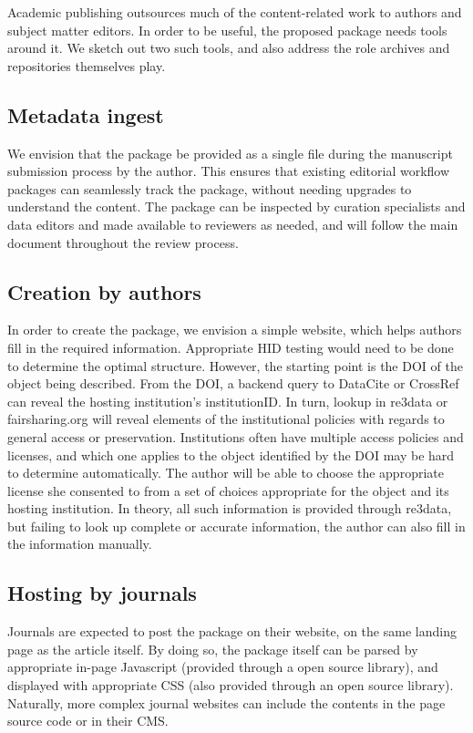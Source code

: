 Academic publishing outsources much of the content-related work to authors and subject matter editors. In order to be useful, the proposed package needs tools around it. We sketch out two such tools, and also address the role archives and repositories themselves play. 
\subsection{Metadata ingest}

We envision that the package be provided as a single file during the manuscript submission process by the author. This ensures that existing editorial workflow packages can seamlessly track the package, without needing upgrades to understand the content. The package can be inspected by curation specialists and data editors and made available to reviewers as needed, and will follow the main document throughout the review process. 
           
\subsection{Creation by authors}
In order to create the package, we envision a simple website, which helps authors fill in the required information. Appropriate HID testing would need to be done to determine the optimal structure. However, the starting point is the DOI of the object being described. From the DOI, a backend query to DataCite or CrossRef can reveal the hosting institution's institutionID. In turn, lookup in re3data or fairsharing.org will reveal elements of the institutional policies with regards to general access or preservation. Institutions often have multiple access policies and licenses, and which one applies to the object identified by the DOI may be hard to determine automatically. The author will be able to choose the appropriate license she consented to from a set of choices appropriate for the object and its hosting institution. In theory, all such information is provided through re3data, but failing to look up complete or accurate information, the author can also fill in the information manually. 
           
\subsection{Hosting by journals}
Journals are expected to post the package on their website, on the same landing page as the article itself. By doing so, the package itself can be parsed by appropriate in-page Javascript (provided through a open source library), and displayed with appropriate CSS (also provided through an open source library). Naturally, more complex journal websites can include the contents in the page source code or in their CMS. 
